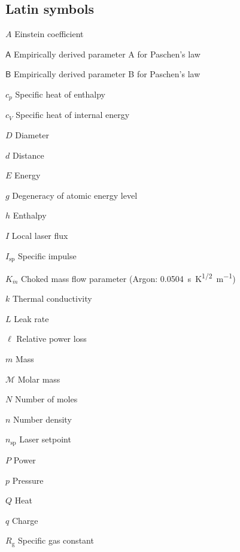 \begin{multicols}{2}
    \section*{Latin symbols}
    \begin{nomlist}
        \item[$A$]              Einstein coefficient %
        \item[$\mathsf{A}$]     Empirically derived parameter A for Paschen's law 
        \item[$\mathsf{B}$]     Empirically derived parameter B for Paschen's law 
        \item[$c_p$]            Specific heat of enthalpy
        \item[$c_V$]            Specific heat of internal energy
        \item[$D$]              Diameter
        \item[$d$]              Distance
        \item[$E$]              Energy
        \item[$g$]              Degeneracy of atomic energy level
        \item[$h$]              Enthalpy
        \item[$I$]              Local laser flux %
        \item[$I_\text{sp}$]    Specific impulse %
        \item[$K_{\dot{m}}$]    Choked mass flow parameter (Argon: \qty{0.0504}{s.K^{1/2}.m^{-1}}) 
        \item[$k$]              Thermal conductivity 
        \item[$L$]              Leak rate
        \item[$\ell$]           Relative power loss
        \item[$m$]              Mass
        \item[$\mathcal{M}$]    Molar mass
        \item[$N$]              Number of moles 
        \item[$n$]              Number density 
        \item[$n_\mathrm{sp}$]  Laser setpoint 
        \item[$P$]              Power 
        \item[$p$]              Pressure
        \item[$Q$]              Heat
        \item[$q$]              Charge
        \item[$R_\mathrm{g}$]   Specific gas constant

\end{nomlist}
\end{multicols}

